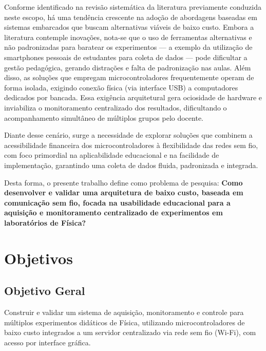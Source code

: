 \documentclass[12pt,a4paper]{article}
\begin{document}
Conforme identificado na revisão sistemática da literatura previamente conduzida neste escopo, há uma tendência crescente na adoção de abordagens baseadas em sistemas embarcados que buscam alternativas viáveis de baixo custo. Embora a literatura contemple inovações, nota-se que o uso de ferramentas alternativas e não padronizadas para baratear os experimentos --- a exemplo da utilização de smartphones pessoais de estudantes para coleta de dados --- pode dificultar a gestão pedagógica, gerando distrações e falta de padronização nas aulas. Além disso, as soluções que empregam microcontroladores frequentemente operam de forma isolada, exigindo conexão física (via interface USB) a computadores dedicados por bancada. Essa exigência arquitetural gera ociosidade de hardware e inviabiliza o monitoramento centralizado dos resultados, dificultando o acompanhamento simultâneo de múltiplos grupos pelo docente.

Diante desse cenário, surge a necessidade de explorar soluções que combinem a acessibilidade financeira dos microcontroladores à flexibilidade das redes sem fio, com foco primordial na aplicabilidade educacional e na facilidade de implementação, garantindo uma coleta de dados fluida, padronizada e integrada. 

Desta forma, o presente trabalho define como problema de pesquisa: \textbf{Como desenvolver e validar uma arquitetura de baixo custo, baseada em comunicação sem fio, focada na usabilidade educacional para a aquisição e monitoramento centralizado de experimentos em laboratórios de Física?}

\section{Objetivos}

\subsection{Objetivo Geral}
Construir e validar um sistema de aquisição, monitoramento e controle para múltiplos experimentos didáticos de Física, utilizando microcontroladores de baixo custo integrados a um servidor centralizado via rede sem fio (Wi-Fi), com acesso por interface gráfica.
\end{document}
